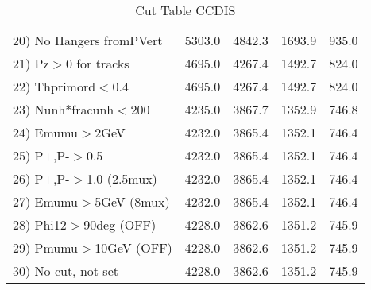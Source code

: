 \begin{table}[h!]
\begin{tabular}{||l||r|r|r|r||}
 20) No Hangers fromPVert &      5303.0 &      4842.3 &      1693.9 &       935.0 \\
 21) Pz$>$0 for tracks    &      4695.0 &      4267.4 &      1492.7 &       824.0 \\
 22) Thprimord$<$0.4      &      4695.0 &      4267.4 &      1492.7 &       824.0 \\
 23) Nunh*fracunh$<$200   &      4235.0 &      3867.7 &      1352.9 &       746.8 \\
 24) Emumu$>$2GeV         &      4232.0 &      3865.4 &      1352.1 &       746.4 \\
 25) P+,P-$>$0.5          &      4232.0 &      3865.4 &      1352.1 &       746.4 \\
 26) P+,P-$>$1.0 (2.5mux) &      4232.0 &      3865.4 &      1352.1 &       746.4 \\
 27) Emumu$>$5GeV  (8mux) &      4232.0 &      3865.4 &      1352.1 &       746.4 \\
 28) Phi12$>$90deg  (OFF) &      4228.0 &      3862.6 &      1351.2 &       745.9 \\
 29) Pmumu$>$10GeV  (OFF) &      4228.0 &      3862.6 &      1351.2 &       745.9 \\
 30) No cut, not set      &      4228.0 &      3862.6 &      1351.2 &       745.9 \\
 \hline
 \hline
 \end{tabular}
 \caption{Cut Table  CCDIS  }
 \label{tab-cut_ccdis}
 \end{table}
